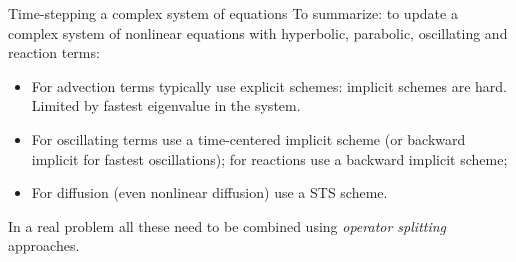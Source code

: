 \documentclass[aspectratio=169]{beamer}
\begin{document}
\begin{frame}{Time-stepping a complex system of equations}
  To summarize: to update a complex system of nonlinear equations with
  hyperbolic, parabolic, oscillating and reaction terms:
  \begin{itemize}
  \item For advection terms typically use explicit schemes: implicit
    schemes are hard. Limited by fastest eigenvalue in the system.
  \item For oscillating terms use a time-centered implicit scheme (or
    backward implicit for fastest oscillations); for reactions use a
    backward implicit scheme;
  \item For diffusion (even nonlinear diffusion) use a STS scheme.
  \end{itemize}
  In a real problem all these need to be combined using \emph{operator
    splitting} approaches.
\end{frame}
\end{document}
